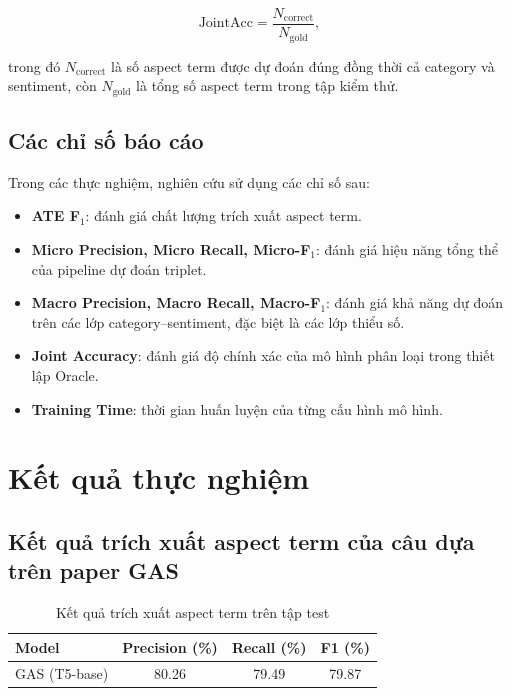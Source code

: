 \begin{equation}
\mathrm{JointAcc}
=
\frac{N_{\mathrm{correct}}}
{N_{\mathrm{gold}}},
\end{equation}

trong đó $N_{\mathrm{correct}}$ là số aspect term được dự đoán đúng đồng
thời cả category và sentiment, còn $N_{\mathrm{gold}}$ là tổng số aspect
term trong tập kiểm thử.

\subsection{Các chỉ số báo cáo}

Trong các thực nghiệm, nghiên cứu sử dụng các chỉ số sau:

\begin{itemize}
    \item \textbf{ATE F$_1$}: đánh giá chất lượng trích xuất aspect term.
    \item \textbf{Micro Precision, Micro Recall, Micro-F$_1$}: đánh giá hiệu năng tổng thể của pipeline dự đoán triplet.
    \item \textbf{Macro Precision, Macro Recall, Macro-F$_1$}: đánh giá khả năng dự đoán trên các lớp category--sentiment, đặc biệt là các lớp thiểu số.
    \item \textbf{Joint Accuracy}: đánh giá độ chính xác của mô hình phân loại trong thiết lập Oracle.
    \item \textbf{Training Time}: thời gian huấn luyện của từng cấu hình mô hình.
\end{itemize}
\section{Kết quả thực nghiệm}
\label{sec:results}
\subsection{Kết quả trích xuất aspect term của câu dựa trên paper GAS \cite{zhang2021gas}}

\begin{table}[H]
\centering
\caption{Kết quả trích xuất aspect term trên tập test}
\label{tab:ate_results}
\small
\begin{tabular}{|l|c|c|c|}
\hline
\textbf{Model} &
\textbf{Precision (\%)} &
\textbf{Recall (\%)} &
\textbf{F1 (\%)} \\
\hline
GAS (T5-base) & 80.26 & 79.49 & 79.87 \\
\hline
\end{tabular}
\end{table}

